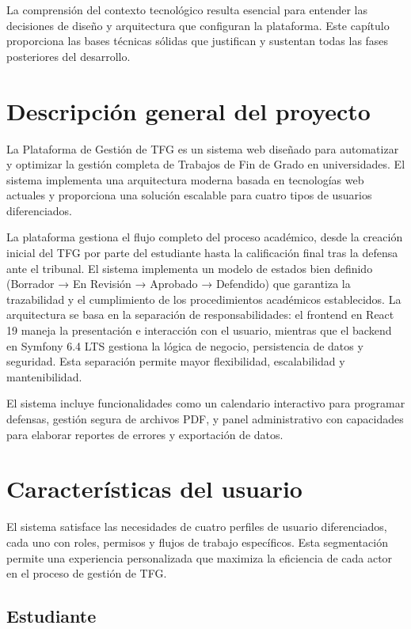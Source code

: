 \documentclass[12pt,a4paper,oneside]{report}
\begin{document}
La comprensión del contexto tecnológico resulta esencial para entender las decisiones de diseño y arquitectura que configuran la plataforma. Este capítulo proporciona las bases técnicas sólidas que justifican y sustentan todas las fases posteriores del desarrollo.

\section{Descripción general del
proyecto}\label{descripciuxf3n-general-del-proyecto}

La Plataforma de Gestión de TFG es un sistema web diseñado para automatizar y optimizar la gestión completa de Trabajos de Fin de Grado en universidades. El sistema implementa una arquitectura moderna basada en tecnologías web actuales y proporciona una solución escalable para cuatro tipos de usuarios diferenciados.

La plataforma gestiona el flujo completo del proceso académico, desde la
creación inicial del TFG por parte del estudiante hasta la calificación
final tras la defensa ante el tribunal. El sistema implementa un modelo
de estados bien definido (Borrador → En Revisión → Aprobado → Defendido)
que garantiza la trazabilidad y el cumplimiento de los procedimientos
académicos establecidos.
La arquitectura se basa en la separación de responsabilidades: el frontend en React 19 maneja la presentación e interacción con el usuario, mientras que el backend en Symfony 6.4 LTS gestiona la lógica de negocio, persistencia de datos y seguridad. Esta separación permite mayor flexibilidad, escalabilidad y mantenibilidad.

El sistema incluye funcionalidades como un calendario interactivo para programar defensas, gestión segura de archivos PDF, y panel administrativo con capacidades para elaborar reportes de errores y exportación de datos.

\section{Características del
usuario}\label{caracteruxedsticas-del-usuario}

El sistema satisface las necesidades de cuatro perfiles de usuario diferenciados, cada uno con roles, permisos y flujos de trabajo específicos. Esta segmentación permite una experiencia personalizada que maximiza la eficiencia de cada actor en el proceso de gestión de TFG.

\subsection{Estudiante}\label{estudiante}
\end{document}
